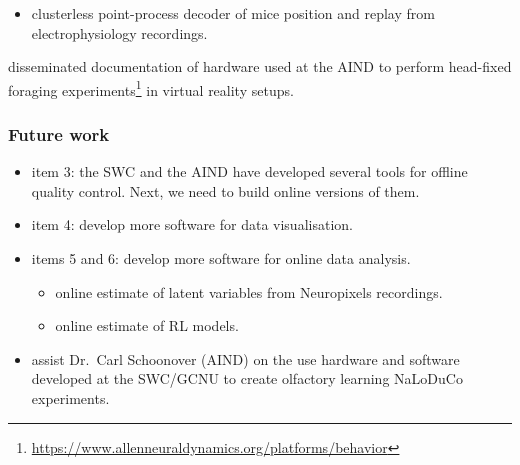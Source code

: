 \begin{frame}
\begin{itemize}
{\begin{itemize}
            \item clusterless point-process decoder of mice position and replay
                from electrophysiology recordings.

        \end{itemize}

        \item  disseminated documentation of hardware used at the AIND to perform
            head-fixed foraging
            experiments\footnote{\url{https://www.allenneuraldynamics.org/platforms/behavior}}
            in virtual reality setups.
        }
    \end{itemize}

\end{frame}

\begin{frame}
    \frametitle{Future work}

    \begin{itemize}

        \item item 3: the SWC and the AIND have developed several
        tools for offline quality control. Next, we need to build online
        versions of them.

        \item item 4: develop more software for data visualisation.

        \item items 5 and 6: develop more software for online data analysis.

        \begin{itemize}

            \item online estimate of latent variables from Neuropixels
            recordings.

            \item online estimate of RL models.

        \end{itemize}

        \item assist Dr.~Carl Schoonover (AIND) on the use hardware and
        software developed at the SWC/GCNU to create olfactory learning
        NaLoDuCo experiments.

    \end{itemize}

\end{frame}

